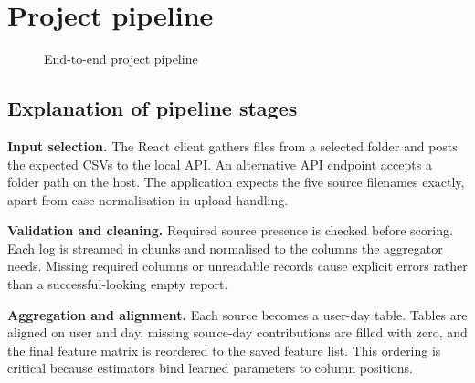 \section{Project pipeline}
\begin{figure}[H]
\centering
{}
\caption{End-to-end project pipeline}
\label{fig:project-pipeline}
\end{figure}

\subsection{Explanation of pipeline stages}
\textbf{Input selection.} The React client gathers files from a selected
folder and posts the expected CSVs to the local API. An alternative
API endpoint accepts a folder path on the host. The application expects
the five source filenames exactly, apart from case normalisation in
upload handling.

\textbf{Validation and cleaning.} Required source presence is checked
before scoring. Each log is streamed in chunks and normalised to the
columns the aggregator needs. Missing required columns or unreadable
records cause explicit errors rather than a successful-looking empty
report.

\textbf{Aggregation and alignment.} Each source becomes a user-day
table. Tables are aligned on user and day, missing source-day
contributions are filled with zero, and the final feature matrix is
reordered to the saved feature list. This ordering is critical because
estimators bind learned parameters to column positions.

